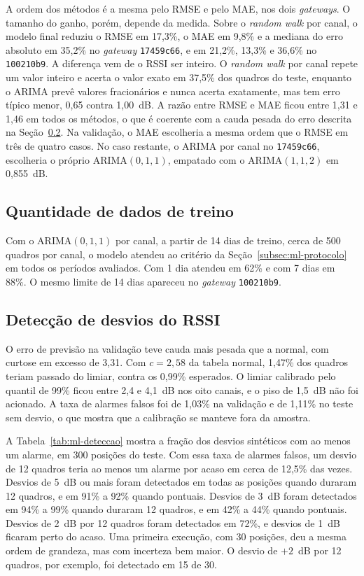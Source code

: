 A ordem dos métodos é a mesma pelo RMSE e pelo MAE, nos dois \textit{gateways}.
O tamanho do ganho, porém, depende da medida. Sobre o \textit{random walk} por
canal, o modelo final reduziu o RMSE em 17,3\%, o MAE em 9,8\% e a mediana do
erro absoluto em 35,2\% no \textit{gateway} \texttt{17459c66}, e em 21,2\%,
13,3\% e 36,6\% no \texttt{100210b9}. A diferença vem de o RSSI ser inteiro.
O \textit{random walk} por canal repete um valor inteiro e acerta o valor
exato em 37,5\% dos quadros do teste, enquanto o ARIMA prevê valores
fracionários e nunca acerta exatamente, mas tem erro típico menor, 0,65 contra
1,00~dB. A razão entre RMSE e MAE ficou entre 1,31 e 1,46 em todos os métodos,
o que é coerente com a cauda pesada do erro descrita na
Seção~\ref{subsec:ml-res-deteccao}. Na validação, o MAE escolheria a mesma
ordem que o RMSE em três de quatro casos. No caso restante, o ARIMA por canal
no \texttt{17459c66}, escolheria o próprio ARIMA$(0,1,1)$, empatado com o
ARIMA$(1,1,2)$ em 0,855~dB.

\subsection{Quantidade de dados de treino}
\label{subsec:ml-res-treino}

Com o ARIMA$(0,1,1)$ por canal, a partir de 14 dias de treino, cerca de 500
quadros por canal, o modelo atendeu ao critério da
Seção~\ref{subsec:ml-protocolo} em todos os períodos avaliados. Com 1 dia
atendeu em 62\% e com 7 dias em 88\%. O mesmo limite de 14 dias apareceu no
\textit{gateway} \texttt{100210b9}.

\subsection{Detecção de desvios do RSSI}
\label{subsec:ml-res-deteccao}

O erro de previsão na validação teve cauda mais pesada que a normal, com
curtose em excesso de 3,31. Com $c = 2{,}58$ da tabela normal, 1,47\% dos
quadros teriam passado do limiar, contra os 0,99\% esperados. O limiar
calibrado pelo quantil de 99\% ficou entre 2,4 e 4,1~dB nos oito canais, e o
piso de 1,5~dB não foi acionado. A taxa de alarmes falsos foi de 1,03\% na
validação e de 1,11\% no teste sem desvio, o que mostra que a calibração se
manteve fora da amostra.

A Tabela~\ref{tab:ml-deteccao} mostra a fração dos desvios sintéticos com ao
menos um alarme, em 300 posições do teste. Com essa taxa de alarmes falsos, um
desvio de 12 quadros teria ao menos um alarme por acaso em cerca de 12,5\% das
vezes. Desvios de 5~dB ou mais foram detectados em todas as posições quando
duraram 12 quadros, e em 91\% a 92\% quando pontuais. Desvios de 3~dB foram
detectados em 94\% a 99\% quando duraram 12 quadros, e em 42\% a 44\% quando
pontuais. Desvios de 2~dB por 12 quadros foram detectados em 72\%, e desvios
de 1~dB ficaram perto do acaso. Uma primeira execução, com 30 posições, deu a
mesma ordem de grandeza, mas com incerteza bem maior. O desvio de $+2$~dB por
12 quadros, por exemplo, foi detectado em 15 de 30.


